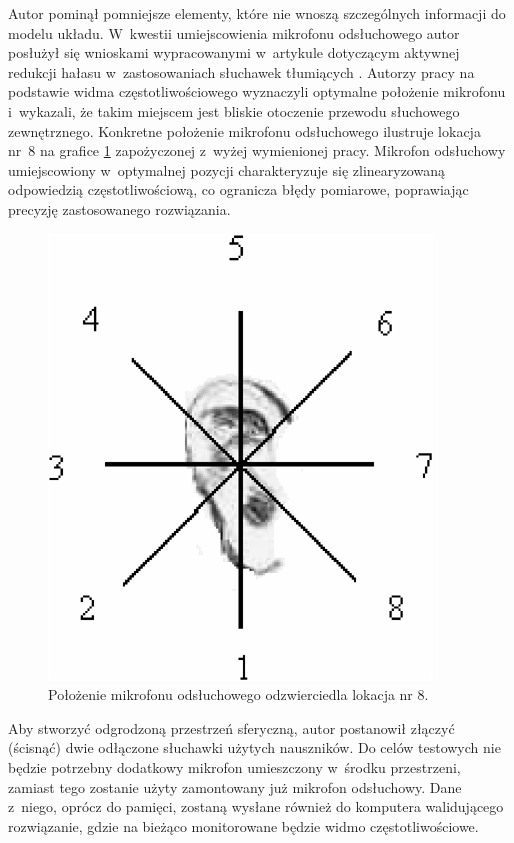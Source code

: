 Autor pominął pomniejsze elementy, które nie wnoszą szczególnych informacji do modelu układu. W~kwestii umiejscowienia mikrofonu odsłuchowego autor posłużył się wnioskami wypracowanymi w~artykule dotyczącym aktywnej redukcji hałasu w~zastosowaniach słuchawek tłumiących \cite{ANC4HP}. Autorzy pracy na podstawie widma częstotliwościowego wyznaczyli optymalne położenie mikrofonu i~wykazali, że takim miejscem jest bliskie otoczenie przewodu słuchowego zewnętrznego. Konkretne położenie mikrofonu odsłuchowego ilustruje lokacja nr~8 na grafice \ref{fig:error_mic_placement} zapożyczonej z~wyżej wymienionej pracy. %
Mikrofon odsłuchowy umiejscowiony w~optymalnej pozycji charakteryzuje się zlinearyzowaną odpowiedzią częstotliwościową, co ogranicza błędy pomiarowe, poprawiając precyzję zastosowanego rozwiązania.
\begin{figure}[h!]
	\centering
	\includegraphics[scale=0.75]{../Assets/error_mic_placement.png}
	\caption{Położenie mikrofonu odsłuchowego odzwierciedla lokacja nr 8.}
	\label{fig:error_mic_placement}
\end{figure}

Aby stworzyć odgrodzoną przestrzeń sferyczną, autor postanowił złączyć (ścisnąć) dwie odłączone słuchawki użytych nauszników. Do celów testowych nie będzie potrzebny dodatkowy mikrofon umieszczony w~środku przestrzeni, zamiast tego zostanie użyty zamontowany już mikrofon odsłuchowy. Dane z~niego, oprócz do pamięci, zostaną wysłane również do komputera walidującego rozwiązanie, gdzie na bieżąco monitorowane będzie widmo częstotliwościowe.

